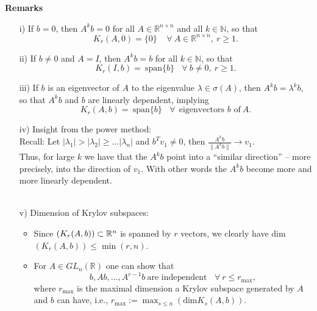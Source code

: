 \begin{frame}
	 \textbf{Remarks}
		\begin{itemize}
			\item [i)]
			If $b=0$, then $A^kb=0$ for all $A\in\mathbb{R}^{n\times n}$ and all $k\in\mathbb{N}$, so that
			$$
			K_r(A,0)=\{0\}~~~~~\forall ~A\in\mathbb{R}^{n\times n},~r\geq 1.
			$$
			\item [ii)]
			If $b\neq 0$ and $A=I$, then $A^kb=b$ for all $ k\in\mathbb{N}$, so that
$$
			 K_r(I,b)=~\text{span}\{b\}~~~~\forall ~b\neq 0,~r\geq 1.
$$
			\item [iii)]
			If $b$ is an eigenvector of $A$ to the eigenvalue $\lambda\in\sigma(A)$, then $A^kb=\lambda^kb$, so that $A^k b$ and $b$ are linearly dependent, implying
			$$
			K_r(A,b)=~\text{span}\{b\}~~~~\forall~~\text{eigenvectors~$b$~of}~A.
			$$
			\item [iv)]
			Insight from the power method:\\
			 Recall: Let $|\lambda_1|>|\lambda_2|\geq\dots|\lambda_n|$ and $b^Tv_1\neq 0$, then $\frac{A^kb}{\|A^kb\|}\rightarrow v_1$. \\
		 Thus, for large $k$ we have that the $A^kb$ point into a ``similar direction'' -- more precisely, into the direction of $v_1$. With other words the $A^kb$ become more and more linearly dependent.\\~\\
			\item [v)]
			Dimension of Krylov subspaces:\\
			\begin{itemize}
				\item Since $(K_r(A,b)) \subset {\mathbb{R}}^{n}$ is spanned by $r$ vectors, we clearly have dim$(K_r(A,b))\leq \min(r,n)$.
				\item 
			 For $A\in GL_n(\mathbb{R})$ one can show that
				$$
				b,Ab,\dots,A^{r-1}b~\text{are independent}~~~~\forall~r\leq r_{\text{max}},
				$$
				where $r_{\text{max}}$ is the maximal dimension a Krylov subspace generated by $A$ and $b$ can have, i.e., $r_{\text{max}}:=\max_{s\leq n}(\text{dim}K_s(A,b))$.
			\end{itemize}
		\end{itemize}
\end{frame}

